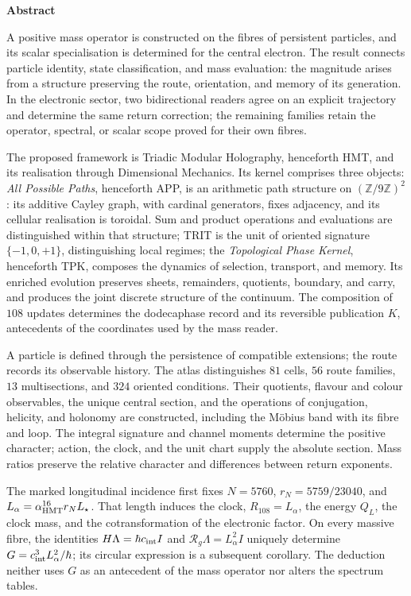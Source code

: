 \begin{center}\bfseries Abstract\end{center}
\begingroup
\fontsize{10.5}{12.8}\selectfont
\setlength{\parskip}{2pt plus 1pt minus .5pt}
\noindent
A positive mass operator is constructed on the fibres of persistent
particles, and its scalar specialisation is determined for the central
electron. The result connects particle identity, state classification,
and mass evaluation: the magnitude arises from a structure preserving
the route, orientation, and memory of its generation. In the electronic
sector, two bidirectional readers agree on an explicit trajectory and
determine the same return correction; the remaining families retain the
operator, spectral, or scalar scope proved for their own fibres.

The proposed framework is Triadic Modular Holography, henceforth HMT, and
its realisation through Dimensional Mechanics. Its kernel comprises three
objects: \emph{All Possible Paths}, henceforth APP, is an arithmetic path
structure on \((\mathbb Z/9\mathbb Z)^2\): its additive Cayley graph,
with cardinal generators, fixes adjacency, and its cellular realisation
is toroidal. Sum and product operations and evaluations are distinguished
within that structure; TRIT is the unit
of oriented signature \(\{-1,0,+1\}\), distinguishing local regimes;
the \emph{Topological Phase Kernel}, henceforth TPK, composes the dynamics
of selection, transport, and memory. Its enriched evolution preserves
sheets, remainders, quotients, boundary, and carry, and produces the joint
discrete structure of the continuum. The composition of \(108\) updates
determines the dodecaphase record and its reversible publication \(K\),
antecedents of the coordinates used by the mass reader.

A particle is defined through the persistence of compatible extensions;
the route records its observable history. The atlas distinguishes \(81\)
cells, \(56\) route families, \(13\) multisections, and \(324\) oriented
conditions. Their quotients, flavour and colour observables, the unique
central section, and the operations of conjugation, helicity, and holonomy
are constructed, including the Möbius band with its fibre and loop. The
integral signature and channel moments determine the positive character;
action, the clock, and the unit chart supply the absolute section. Mass
ratios preserve the relative character and differences between return
exponents.

The marked longitudinal incidence first fixes
\(N=5760\), \(r_N=5759/23040\), and
\(L_\alpha=\alpha_{\rm HMT}^{16}r_NL_\star\). That length induces the
clock, \(R_{108}=L_\alpha\), the energy \(Q_L\), the clock mass, and the
cotransformation of the electronic factor. On every massive fibre, the
identities \(H\Lambda=\hbar c_{\rm int}I\) and
\(\mathcal R_g\Lambda=L_\alpha^2I\) uniquely determine
\(G=c_{\rm int}^3L_\alpha^2/\hbar\); its circular expression is a
subsequent corollary. The deduction neither uses \(G\) as an antecedent
of the mass operator nor alters the spectrum tables.

